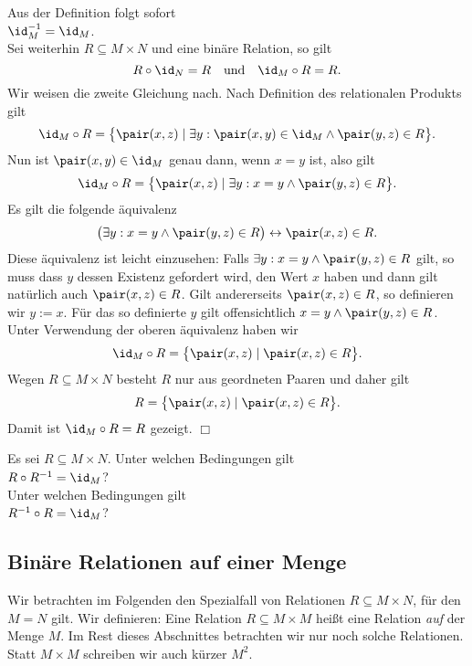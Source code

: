 \noindent
Aus der Definition folgt sofort \\[0.2cm]
\hspace*{1.3cm} $\id_M^{-1} = \id_M$. \\[0.2cm]
Sei weiterhin $R \subseteq M \times N$ und eine bin\"{a}re Relation, so
gilt 
\[ R \circ \id_N = R \quad \mbox{und} \quad \id_M \circ R = R. \] 
Wir weisen die zweite Gleichung nach.  Nach Definition des relationalen Produkts
gilt
\[ \id_M \circ R = \bigl\{ \pair(x,z) \mid \exists y: \pair(x,y) \in \id_M \wedge \pair(y,z) \in R \bigr\}. \]
Nun ist $\pair(x,y) \in \id_M$ genau dann, wenn $x = y$ ist, also gilt
\[ \id_M \circ R = \bigl\{ \pair(x,z) \mid \exists y: x = y \wedge \pair(y,z) \in R \bigr\}. \]
Es gilt die folgende \"{a}quivalenz
\[ \bigl( \exists y: x = y \wedge \pair(y,z) \in R \bigr) \leftrightarrow \pair(x,z) \in R. \]
Diese \"{a}quivalenz ist leicht einzusehen:  Falls $\exists y: x = y \wedge \pair(y,z) \in R$
gilt, so muss dass $y$ dessen Existenz gefordert wird, den Wert $x$ haben und dann gilt
nat\"{u}rlich auch $\pair(x,z) \in R$.  Gilt andererseits $\pair(x,z) \in R$, so definieren
wir $y := x$.  F\"{u}r das so definierte $y$ gilt offensichtlich 
$x = y \wedge \pair(y,z) \in R$.  Unter Verwendung der oberen \"{a}quivalenz haben wir 
\[ \id_M \circ R = \bigl\{ \pair(x,z) \mid \pair(x,z) \in R \bigr\}. \]
Wegen  $R \subseteq M \times N$ besteht $R$ nur aus geordneten
Paaren und daher gilt
\[ R = \bigl\{ \pair(x,z) \mid \pair(x,z) \in R \bigr\}. \]
Damit ist $\id_M \circ R = R$ gezeigt. \hspace*{\fill} $\Box$

\exercise
Es sei $R \subseteq M \times N$.  Unter welchen Bedingungen gilt 
\\[0.2cm]
\hspace*{1.3cm}
$R \circ R^{-1} = \id_M$? 
\\[0.2cm]
Unter welchen Bedingungen gilt
\\[0.2cm]
\hspace*{1.3cm}
$R^{-1} \circ R = \id_M$?
\eox



\subsection{Bin\"{a}re Relationen auf einer Menge}
Wir betrachten im Folgenden den Spezialfall von Relationen $R \subseteq M \times N$, f\"{u}r
den $M = N$ gilt.  Wir definieren:
Eine Relation $R \subseteq M \times M$ heißt eine Relation \emph{auf} der Menge $M$.
Im Rest dieses Abschnittes betrachten wir nur noch solche Relationen. 
Statt $M \times M$ schreiben wir auch k\"{u}rzer $M^2$.

